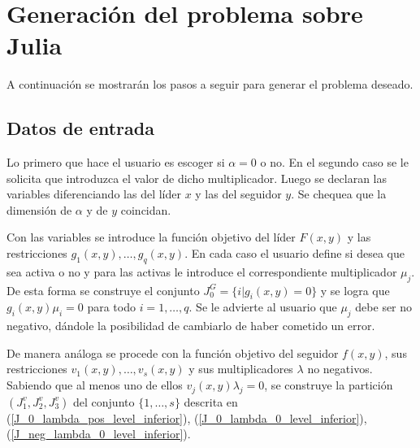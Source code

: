 \section{Generación del problema sobre Julia}
A continuación se mostrarán los pasos a seguir para generar el problema deseado.
\subsection{Datos de entrada}

Lo primero  que hace el usuario es escoger si $\alpha=0$ o no. En el segundo caso se le solicita que  introduzca el valor de dicho multiplicador. Luego se
declaran las  variables diferenciando las del líder $x$ y las del seguidor $y$. Se chequea que la dimensión de   $\alpha$  y de $y$ coincidan. 

Con las variables se introduce la función objetivo del líder $F(x,y)$ y las restricciones $ g_1(x,y),\ldots, g_q(x,y)$. En cada caso el usuario define si desea que sea activa o no y para las activas  le introduce el correspondiente multiplicador $\mu_j$. De esta forma se construye el conjunto $J_0^G=\{i | g_i(x,y)=0\}$ y se logra que  $g_i(x,y)\mu_i=0$ para todo $i=1,\ldots,q$. Se le advierte al usuario que $\mu_j$ debe ser no negativo, dándole la posibilidad de cambiarlo de haber cometido un error.

De manera análoga se procede con la función objetivo del seguidor $f(x,y)$,  sus restricciones  $ v_1(x,y),\ldots, v_s(x,y)$ y sus multiplicadores $\lambda$  no negativos. Sabiendo que al menos uno de ellos $v_j(x,y)\lambda_j=0$, se construye la partición $(J_1^v,J_2^v,J_3^v)$  del conjunto $\{1,\ldots,s\}$  descrita en (\ref{J_0_lambda_pos_level_inferior}),  (\ref{J_0_lambda_0_level_inferior}),  (\ref{J_neg_lambda_0_level_inferior}).

